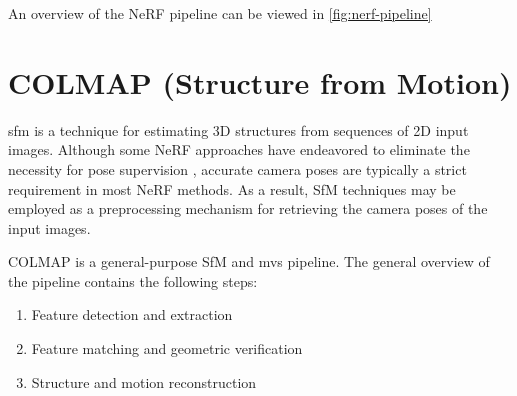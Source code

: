 


An overview of the NeRF pipeline can be viewed in \autoref{fig:nerf-pipeline}




\section{COLMAP (Structure from Motion)} \label{sec:colmap}
\acrshort{sfm} is a technique for estimating 3D structures from sequences of 2D input images. Although some NeRF approaches have  endeavored to eliminate the necessity for pose supervision \cite{lin_barf_2021}\cite{wang_nerf--_2022}, accurate camera poses are typically a strict requirement in most NeRF methods. As a result, SfM techniques may be employed as a preprocessing mechanism for retrieving the camera poses of the input images.



COLMAP is a general-purpose SfM \cite{schonberger_structure--motion_2016} and \acrfull{mvs} \cite{schoenberger2016mvs} pipeline. The general overview of the pipeline contains the following steps:
\begin{enumerate}
    \item Feature detection and extraction
    \item Feature matching and geometric verification
    \item Structure and motion reconstruction
\end{enumerate}

